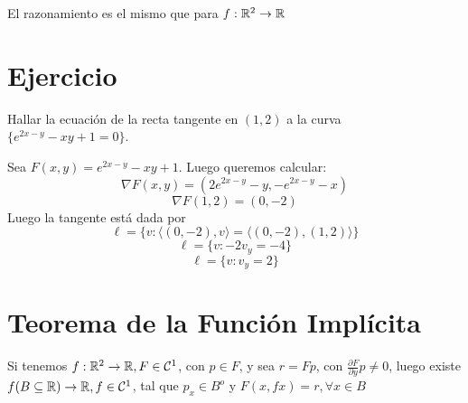 \documentclass{article}
\begin{document}
El razonamiento es el mismo que para $f : \mathbb{R}^2 \to \mathbb{R}$

\section*{Ejercicio}
Hallar la ecuación de la recta tangente en $(1,2)$ a la curva $\{e^{2x-y} -xy + 1 = 0\}$.

Sea $F(x,y) = e^{2x-y} -xy + 1$. Luego queremos calcular:
\[\nabla F(x,y) = (2e^{2x-y}-y, -e^{2x-y}-x)\]
\[\nabla F(1,2) = (0, -2)\]
Luego la tangente está dada por
\[\ell = \{v : \langle (0,-2), v \rangle = \langle (0,-2), (1,2) \rangle \}\]
\[\ell = \{v : -2v_y = -4 \}\]
\[\ell = \{v : v_y = 2 \}\]

\section*{Teorema de la Función Implícita}
Si tenemos $f : \mathbb{R}^2 \to \mathbb{R}, F \in \mathcal{C}^1$, con $p \in F$, y sea $r = Fp$, con $\frac{\partial F}{\partial y}p \neq 0$, luego existe $f (B \subseteq \mathbb{R}) \to \mathbb{R}, f\in \mathcal{C}^1$, tal que $p_x \in B^o$ y $F(x, fx) = r, \forall x \in B$
\end{document}
